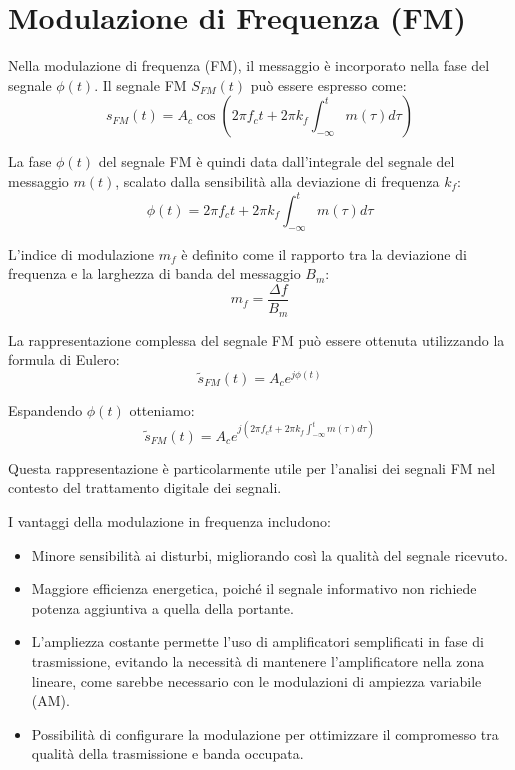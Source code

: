 \section*{Modulazione di Frequenza (FM)}

Nella modulazione di frequenza (FM), il messaggio è incorporato nella fase del segnale \( \phi(t) \). Il segnale FM \( S_{FM}(t) \) può essere espresso come:
\begin{equation}
    s_{FM}(t) = A_c \cos\left(2\pi f_c t + 2\pi k_f \int_{-\infty}^{t} m(\tau) d\tau \right)
\end{equation}

La fase \( \phi(t) \) del segnale FM è quindi data dall'integrale del segnale del messaggio \( m(t) \), scalato dalla sensibilità alla deviazione di frequenza \( k_f \):
\begin{equation}
    \phi(t) = 2\pi f_c t + 2\pi k_f \int_{-\infty}^{t} m(\tau) d\tau
\end{equation}

L'indice di modulazione \( m_f \) è definito come il rapporto tra la deviazione di frequenza e la larghezza di banda del messaggio \( B_m \):
\begin{equation}
    m_f = \frac{\Delta f}{B_m}
\end{equation}

La rappresentazione complessa del segnale FM può essere ottenuta utilizzando la formula di Eulero:
\begin{equation}
    \tilde{s}_{FM}(t) = A_c e^{j\phi(t)}
\end{equation}

Espandendo \( \phi(t) \) otteniamo:
\begin{equation}
    \tilde{s}_{FM}(t) = A_c e^{j\left(2\pi f_c t + 2\pi k_f \int_{-\infty}^{t} m(\tau) d\tau\right)}
\end{equation}

Questa rappresentazione è particolarmente utile per l'analisi dei segnali FM nel contesto del trattamento digitale dei segnali.

I vantaggi della modulazione in frequenza includono:
\begin{itemize}
    \item Minore sensibilità ai disturbi, migliorando così la qualità del segnale ricevuto.
    \item Maggiore efficienza energetica, poiché il segnale informativo non richiede potenza aggiuntiva a quella della portante.
    \item L'ampliezza costante permette l'uso di amplificatori semplificati in fase di trasmissione, evitando la necessità di mantenere l'amplificatore nella zona lineare, come sarebbe necessario con le modulazioni di ampiezza variabile (AM).
    \item Possibilità di configurare la modulazione per ottimizzare il compromesso tra qualità della trasmissione e banda occupata.
\end{itemize}



